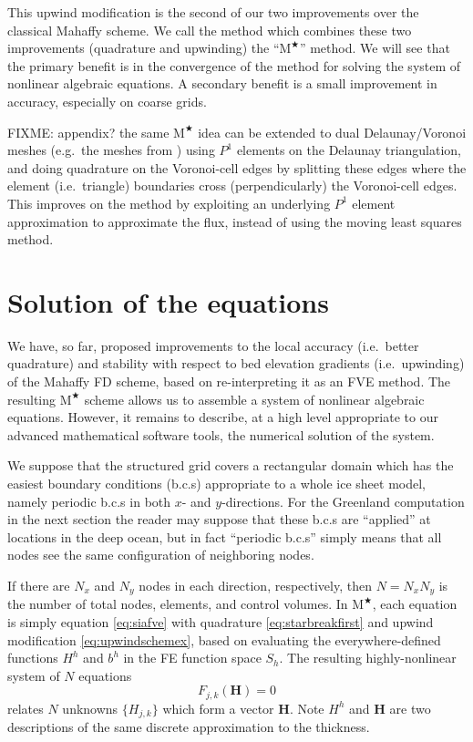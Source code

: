 \documentclass[twocolumn,letterpaper]{igs}
\newcommand\bH{\mathbf{H}}
\newcommand{\Mstar}{$\text{M}^{\bigstar}$\xspace}
\begin{document}
This upwind modification is the second of our two improvements over the classical Mahaffy scheme.  We call the method which combines these two improvements (quadrature and upwinding) the ``\Mstar'' method.  We will see that the primary benefit is in the convergence of the method for solving the system of nonlinear algebraic equations.  A secondary benefit is a small improvement in accuracy, especially on coarse grids.

FIXME: appendix? the same \Mstar idea can be extended to dual Delaunay/Voronoi meshes (e.g.~the meshes from \cite{EgholmNielsen2010,Ringleretal2013}) using $P^1$ elements on the Delaunay triangulation, and doing quadrature on the Voronoi-cell edges by splitting these edges where the element (i.e.~triangle) boundaries cross (perpendicularly) the Voronoi-cell edges.  This improves on the \cite{EgholmNielsen2010} method by exploiting an underlying $P^1$ element approximation to approximate the flux, instead of using the moving least squares method.


\section{Solution of the equations} \label{sec:solution}

We have, so far, proposed improvements to the local accuracy (i.e.~better quadrature) and stability with respect to bed elevation gradients (i.e.~upwinding) of the Mahaffy FD scheme, based on re-interpreting it as an FVE method.  The resulting \Mstar scheme allows us to assemble a system of nonlinear algebraic equations.  However, it remains to describe, at a high level appropriate to our advanced mathematical software tools, the numerical solution of the system.

We suppose that the structured grid covers a rectangular domain which has the easiest boundary conditions (b.c.s) appropriate to a whole ice sheet model, namely periodic b.c.s in both $x$- and $y$-directions.  For the Greenland computation in the next section the reader may suppose that these b.c.s are ``applied'' at locations in the deep ocean, but in fact ``periodic b.c.s'' simply means that all nodes see the same configuration of neighboring nodes.

If there are $N_x$ and $N_y$ nodes in each direction, respectively, then $N=N_x N_y$ is the number of total nodes, elements, and control volumes.  In \Mstar, each equation is simply equation \eqref{eq:siafve} with quadrature \eqref{eq:starbreakfirst} and upwind modification \eqref{eq:upwindschemex}, based on evaluating the everywhere-defined functions $H^h$ and $b^h$ in the FE function space $S_h$.  The resulting highly-nonlinear system of $N$ equations
\begin{equation}
F_{j,k}(\bH) = 0   \label{eq:nonlinsystem}
\end{equation}
relates $N$ unknowns $\{H_{j,k}\}$ which form a vector $\bH$.  Note $H^h$ and $\bH$ are two descriptions of the same discrete approximation to the thickness.
\end{document}
